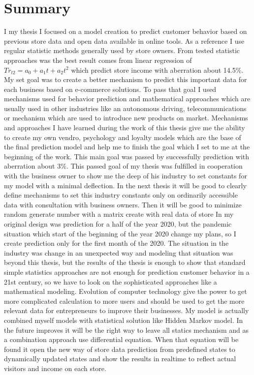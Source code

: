 
\chapter{Summary} \label{summary}
I my thesis I focused on a model creation to predict customer behavior based on previous store data and open data available in online tools.
As a reference I use regular statistic methods generally used by store owners.
From tested statistic approaches was the best result comes from linear regression of $Tr_{t2}=a_0+a_1t+a_2t^2$ which predict store income with aberration about 14.5\%.
My set goal was to create a better mechanism to predict this important data for each business based on e-commerce solutions.
To pass that goal I used mechanisms used for behavior prediction and mathematical approaches which are usually used in other industries like an autonomous driving,
telecommunications or mechanism which are used to introduce new products on market.
Mechanisms and approaches I have learned during the work of this thesis give me the ability to create my own vendro, psychology and loyalty models which are the
base of the final prediction model and help me to finish the goal which I set to me at the beginning of the work.
This main goal was passed by successfully prediction with aberration about 3\%.
This passed goal of my thesis was fulfilled in cooperation with the business owner to show me the deep of his industry to set constants for my model with a minimal deflection.
In the next thesis it will be good to clearly define mechanisms to set this industry constants only on ordinarily accessible data with consultation with business owners.
Then it will be good to minimize random generate number with a matrix create with real data of store
In my original design was prediction for a half of the year 2020, but the pandemic situation which start of the beginning of the year 2020 change my plans,
so I create prediction only for the first month of the 2020.
The situation in the industry was change in an unexpected way and modeling that situation was beyond this thesis, but the results of the thesis is enough to show that standard
simple statistics approaches are not enough for prediction customer behavior in a 21st century, so we have to look on the sophisticated approaches like a mathematical modeling.
Evolution of computer technology give the power to get more complicated calculation to more users and should be used to get the more relevant data for entrepreneurs to improve their businesses.
My model is actually combined myself models with statistical solution like Hidden Markov model.
In the future improves it will be the right way to leave all statics mechanism and as a combination approach use differential equation.
When that equation will be found it open the new way of store data prediction from predefined states to dynamically updated states and show the results in realtime to reflect actual visitors and income on each store.
